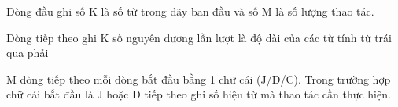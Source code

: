 Dòng đầu ghi số K là số từ trong dãy ban đầu và số M là số lượng thao tác.

Dòng tiếp theo ghi K số nguyên dương lần lượt là độ dài của các từ tính từ trái qua phải

M dòng tiếp theo mỗi dòng bắt đầu bằng 1 chữ cái (J/D/C). Trong trường hợp chữ cái bắt đầu là J hoặc D tiếp theo ghi số hiệu từ mà thao tác cần thực hiện.